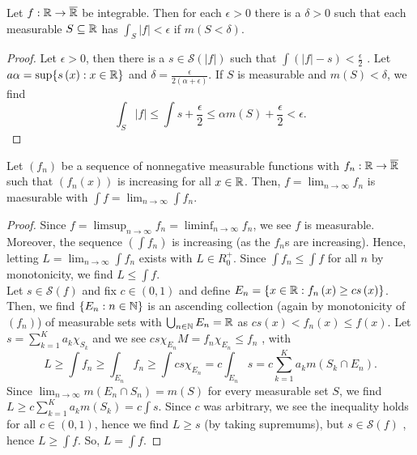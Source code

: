 \begin{proposition}
	Let \(f: \mathbb{R} \to \overline{\mathbb{R}}\) be integrable. Then for each \(\epsilon > 0\) there is a \(\delta > 0\) such that each measurable \(S \subseteq \mathbb{R}\) has \(\int_{S} \left| f \right| < \epsilon\) if \(m\left( S < \delta \right) \).
\end{proposition}
\begin{proof}
	Let \(\epsilon > 0\), then there is a \(s \in \mathscr{S}\left( \left| f \right|  \right) \) such that \(\int\left( \left| f \right| -s \right) < \frac{\epsilon}{2}\) . Let \(a\alpha = \sup \{ s\left( x \right)  : x \in \mathbb{R} \} \) and \(\delta = \frac{\epsilon}{2\left( \alpha + \epsilon \right) }\). If \(S\) is measurable and \(m\left( S \right) < \delta\), we find \[
		\int_{S}\left| f \right| \le \int  s + \frac{\epsilon}{2}  \le \alpha m\left( S \right)  + \frac{\epsilon}{2} < \epsilon
	.\]
\end{proof}
\begin{theorem}
	Let \(\left( f_{n} \right) \) be a sequence of nonnegative measurable functions with \(f_{n}:\mathbb{R}  \to\overline{\mathbb{R}} \) such that \(\left( f_{n} \left( x \right) \right) \) is increasing for all \(x \in \mathbb{R}\). Then, \(f = \lim_{n \to \infty}f_{n}\) is maesurable with \(\int f = \lim_{n \to \infty}\int f_{n}\).
\end{theorem}
\begin{proof}
	Since \(f = \limsup_{n \to \infty} f_{n} = \liminf_{n \to \infty} f_{n}\), we see \(f\) is measurable. Moreover, the sequence \(\left( \int f_{n} \right) \) is increasing (as the \(f_{n}\)s are increasing). Hence, letting \( L = \lim_{n \to \infty}\int f_{n}\)  exists with \(L \in R^{+}_0\). Since \(\int f_{n} \le \int f\) for all \(n\)  by monotonicity, we find \(L \le \int f\).\\
	Let \(s \in \mathscr{S}\left( f \right) \) and fix \(c \in \left( 0, 1 \right) \) and define \(E_{n} = \{x \in \mathbb{R} : f_{n}\left( x \right) \ge c s\left( x \right) \} \). Then, we find \(\{E_{n} : n \in \mathbb{N}\} \) is an ascending collection (again by monotonicity of \(\left( f_{n} \right) \)) of measurable sets with \(\bigcup_{n \in \mathbb{N}} E_{n} = \mathbb{R}\) as \(cs\left( x \right) < f_{n}\left( x \right) \le f\left( x \right) \). Let \(s = \sum_{k=1}^{K} a_{k} \chi_{S_{k}}\) and we see \(cs \chi_{E_{n}} M= f_{n} \chi_{E_{n}} \le f_{n}\) , with \[L \ge \int f_{n} \ge \int_{E_{n}} f_{n} \ge \int cs \chi_{E_{n}} = c\int_{E_{n}}s = c \sum_{k=1}^{K} a_{k} m\left( S_{k} \cap E_{n} \right) .\]
	Since \(\lim_{n \to \infty} m\left( E_{n} \cap S_{n} \right) = m\left( S \right)  \) for every measurable set \(S\), we find \(L \ge c \sum_{k=1}^{K} a_{k} m\left( S_{k} \right) = c\int s \). Since \(c\) was arbitrary, we see the inequality holds for all \(c \in \left( 0, 1 \right) \), hence we find \(L \ge s\) (by taking supremums), but \(s \in \mathscr{S}\left( f \right) \) , hence \(L \ge \int f\). So, \(L = \int f\).
\end{proof}
